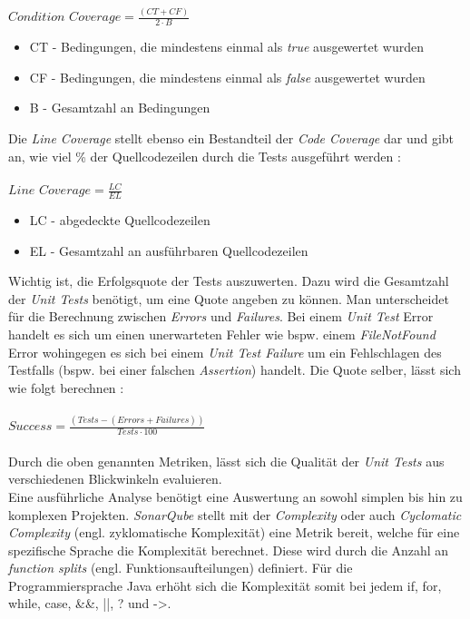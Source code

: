$Condition \,\, Coverage = \frac{(CT + CF)}{2 \cdot B}$
\begin{itemize}
    \setlength{\parskip}{1pt}
    \item CT - Bedingungen, die mindestens einmal als \textit{true} ausgewertet wurden
    \item CF - Bedingungen, die mindestens einmal als \textit{false} ausgewertet wurden
    \item B - Gesamtzahl an Bedingungen
\end{itemize}
Die \textit{Line Coverage} stellt ebenso ein Bestandteil der \textit{Code Coverage} dar und gibt an, wie viel \% der Quellcodezeilen durch die Tests ausgeführt werden \cite*{MetricDefinition}:\\\\
$Line \,\, Coverage = \frac{LC}{EL}$
\begin{itemize}
    \setlength{\parskip}{1pt}
    \item LC - abgedeckte Quellcodezeilen
    \item EL - Gesamtzahl an ausführbaren Quellcodezeilen
\end{itemize}
Wichtig ist, die Erfolgsquote der Tests auszuwerten. Dazu wird die Gesamtzahl der \textit{Unit Tests} benötigt, um eine Quote angeben zu können. Man unterscheidet für die Berechnung zwischen \textit{Errors} und \textit{Failures}. Bei einem \textit{Unit Test} Error handelt es sich um einen unerwarteten Fehler wie bspw. einem \textit{FileNotFound} Error wohingegen es sich bei einem \textit{Unit Test Failure} um ein Fehlschlagen des Testfalls (bspw. bei einer falschen \textit{Assertion}) handelt. Die Quote selber, lässt sich wie folgt berechnen \cite*{MetricDefinition}:\\\\
$Success = \frac{(Tests - (Errors + Failures))}{Tests \cdot 100}$\\\\
Durch die oben genannten Metriken, lässt sich die Qualität der \textit{Unit Tests} aus verschiedenen Blickwinkeln evaluieren.\\
Eine ausführliche Analyse benötigt eine Auswertung an sowohl simplen bis hin zu komplexen Projekten. \textit{SonarQube} stellt mit der \textit{Complexity} oder auch \textit{Cyclomatic Complexity} (engl. zyklomatische Komplexität) eine Metrik bereit, welche für eine spezifische Sprache die Komplexität berechnet. Diese wird durch die Anzahl an \textit{function splits} (engl. Funktionsaufteilungen) definiert. Für die Programmiersprache Java erhöht sich die Komplexität somit bei jedem \colorbox{gray!20}{if}, \colorbox{gray!20}{for}, \colorbox{gray!20}{while}, \colorbox{gray!20}{case}, \colorbox{gray!20}{\&\&}, \colorbox{gray!20}{||}, \colorbox{gray!20}{?} und \colorbox{gray!20}{->}. \cite*{MetricDefinition}
